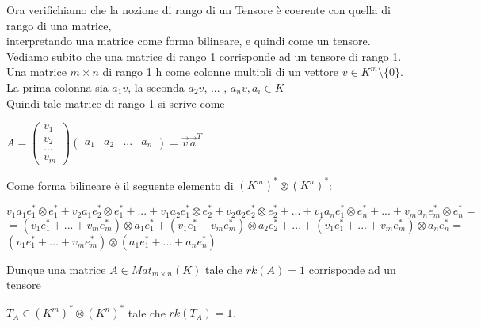 \documentclass[a4paper,12pt]{article}
\theoremstyle{def}
\theoremstyle{prop}
\theoremstyle{esempio}
\theoremstyle{dimostrazione}
\theoremstyle{teo}
\theoremstyle{osservazione}
\begin{document}
Ora verifichiamo che la nozione di rango di un Tensore è coerente con quella di rango di una matrice,\\
interpretando una matrice come forma bilineare, e quindi come un tensore.\\
Vediamo subito che una matrice di rango 1 corrisponde ad un tensore di rango 1.\\
Una matrice \(m \times n\) di rango 1 h come colonne multipli di un vettore \(v \in K^m \setminus \{0\}\).\\
La prima colonna sia \(a_1v\), la seconda \(a_2v\), ... , \(a_nv, a_i \in K\)\\
Quindi tale matrice di rango 1 si scrive come 
\begin{center}
	\(A = \begin{pmatrix}
		v_1 \\
		v_2 \\
		... \\
		v_m
	\end{pmatrix}
	\begin{pmatrix}
		a_1 & a_2 & ... & a_n
	\end{pmatrix} = \overrightarrow{v} \overrightarrow{a}^T\)\\
\end{center}
Come forma bilineare è il seguente elemento di \((K^m)^* \otimes (K^n)^*\):
\begin{center}
	\(v_1 a_1 e_1^* \otimes e_1^* + v_2 a_1 e_2^* \otimes e_1^* + ... + v_1 a_2 e_1^* \otimes e_2^* + v_2 a_2 e_2^* \otimes e_2^* + ... + v_1 a_n e_1^* \otimes e_n^* + ... + v_m a_n e_m^* \otimes e_n^* =\)\\
	\(= (v_1 e_1^* + ... + v_m e_m^*) \otimes a_1 e_1^* + (v_1 e_1^* + v_m e_m^*) \otimes a_2 e_2^* + ... + (v_1 e_1^* + ... + v_m e_m^*) \otimes a_n e_n^* = \)\\
	\((v_1 e_1^* + ... + v_m e_m^*) \otimes (a_1 e_1^* + ... + a_n e_n^*)\)
\end{center}
Dunque una matrice \(A \in Mat_{m \times n} (K)\) tale che \(rk(A) = 1\) corrisponde ad un tensore
\begin{center}
	\(T_A \in (K^m)^* \otimes (K^n)^*\) tale che \(rk(T_A) = 1\).
\end{center}
\end{document}
